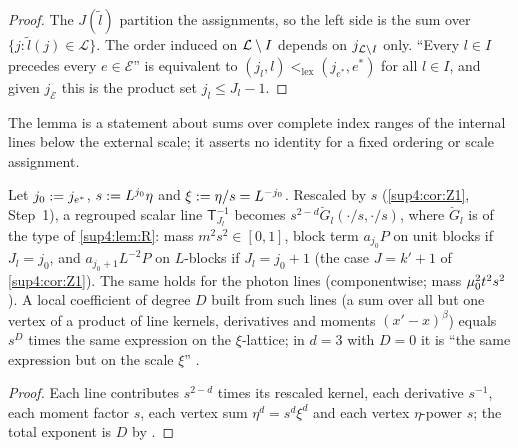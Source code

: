 \begin{proof}
The $J(\tilde l)$ partition the assignments, so the left side is the sum over $\{j:\tilde l(j)\in\mathcal L\}$. The order induced on $\mathcal L\setminus I$ depends on $j_{\mathcal L\setminus I}$ only. ``Every $l\in I$ precedes every $e\in\mathcal E$'' is equivalent to $(j_l,l)<_{\mathrm{lex}}(j_{e^*},e^*)$ for all $l\in I$, and given $j_{\mathcal E}$ this is the product set $j_l\le J_l-1$.
\end{proof}

The lemma is a statement about sums over complete index ranges of the internal lines below the external scale; it asserts no identity for a fixed ordering or scale assignment.

\begin{lemma}\label{sup4:lem:S215}
Let $j_0:= j_{e^*}$, $s:= L^{j_0}\eta$ and $\xi:=\eta/s=L^{-j_0}$. Rescaled by $s$ (\cref{sup4:cor:Z1}, Step~1), a regrouped scalar line $\mathsf T_{J_l}^{-1}$ becomes $s^{2-d}\breve G_l(\cdot/s,\cdot/s)$, where $\breve G_l$ is of the type of \cref{sup4:lem:R}: mass $m^2s^2\in[0,1]$, block term $a_{j_0}P$ on unit blocks if $J_l=j_0$, and $a_{j_0+1}L^{-2}P$ on $L$-blocks if $J_l=j_0+1$ (the case $J=k'+1$ of \cref{sup4:cor:Z1}). The same holds for the photon lines (componentwise; mass $\mu_0^2t^2s^2$). A local coefficient of degree $D$ built from such lines (a sum over all but one vertex of a product of line kernels, derivatives and moments $(x'-x)^\beta$) equals $s^D$ times the same expression on the $\xi$-lattice; in $d=3$ with $D=0$ it is ``the same expression but on the scale $\xi$'' \cite[p.~444]{Ba3}.
\end{lemma}

\begin{proof}
Each line contributes $s^{2-d}$ times its rescaled kernel, each derivative $s^{-1}$, each moment factor $s$, each vertex sum $\eta^d=s^d\xi^d$ and each vertex $\eta$-power $s$; the total exponent is $D$ by \cite[(2.1)--(2.3)]{Ba3}.
\end{proof}

